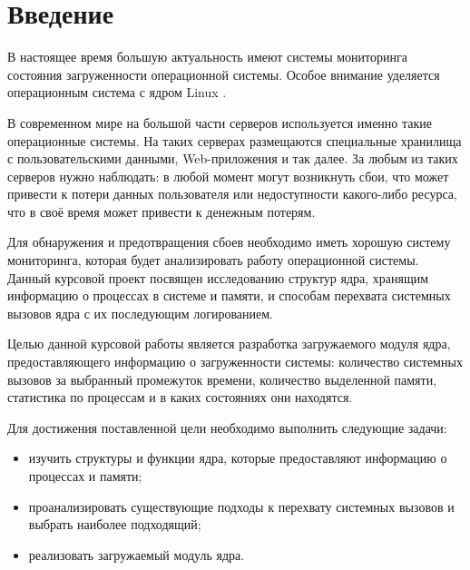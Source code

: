\chapter*{Введение}

В настоящее время большую актуальность имеют системы мониторинга состояния загруженности операционной системы. Особое внимание уделяется операционным система с ядром Linux \cite{linux}.

В современном мире на большой части серверов используется именно такие операционные системы. На таких серверах размещаются специальные хранилища с пользовательскими данными, Web-приложения и так далее. За любым из таких серверов нужно наблюдать: в любой момент могут возникнуть сбои, что может привести к потери данных пользователя или недоступности какого-либо ресурса, что в своё время может привести к денежным потерям.

Для обнаружения и предотвращения сбоев необходимо иметь хорошую систему мониторинга, которая будет анализировать работу операционной системы. Данный курсовой проект посвящен исследованию структур ядра, хранящим информацию о процессах в системе и памяти, и способам перехвата системных вызовов ядра с их последующим логированием.

Целью данной курсовой работы является разработка загружаемого модуля ядра, предоставляющего информацию о загруженности системы: количество системных вызовов за выбранный промежуток времени, количество выделенной памяти, статистика по процессам и в каких состояниях они находятся.

Для достижения поставленной цели необходимо выполнить следующие задачи:

\begin{itemize}
	\item изучить структуры и функции ядра, которые предоставляют информацию о процессах и памяти;
	\item проанализировать существующие подходы к перехвату системных вызовов и выбрать наиболее подходящий;
	\item реализовать загружаемый модуль ядра.
\end{itemize}